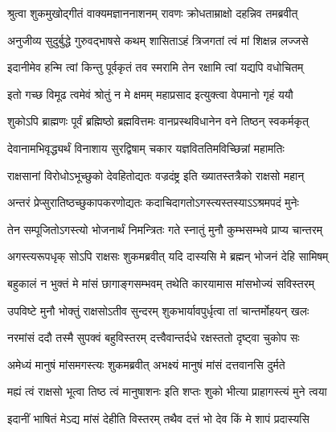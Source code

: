 




\twolineshloka
{श्रुत्वा शुकमुखोद्गीतं वाक्यमज्ञाननाशनम्}
{रावणः क्रोधताम्राक्षो दहन्निव तमब्रवीत्} %

\twolineshloka
{अनुजीव्य सुदुर्बुद्धे गुरुवद्भाषसे कथम्}
{शासिताऽहं त्रिजगतां त्वं मां शिक्षन्न लज्जसे} %

\twolineshloka
{इदानीमेव हन्मि त्वां किन्तु पूर्वकृतं तव}
{स्मरामि तेन रक्षामि त्वां यद्यपि वधोचितम्} %

\twolineshloka
{इतो गच्छ विमूढ त्वमेवं श्रोतुं न मे क्षमम्}
{महाप्रसाद इत्युक्त्वा वेपमानो गृहं ययौ} %

\twolineshloka
{शुकोऽपि ब्राह्मणः पूर्वं ब्रह्मिष्ठो ब्रह्मवित्तमः}
{वानप्रस्थविधानेन वने तिष्ठन् स्वकर्मकृत्} %

\twolineshloka
{देवानामभिवृद्ध्यर्थं विनाशाय सुरद्विषाम्}
{चकार यज्ञविततिमविच्छिन्नां महामतिः} %

\twolineshloka
{राक्षसानां विरोधोऽभूच्छुको देवहितोद्यतः}
{वज्रदंष्ट्र इति ख्यातस्तत्रैको राक्षसो महान्} %

\twolineshloka
{अन्तरं प्रेप्सुरातिष्ठच्छुकापकरणोद्यतः}
{कदाचिदागतोऽगस्त्यस्तस्याऽऽश्रमपदं मुनेः} %

\twolineshloka
{तेन सम्पूजितोऽगस्त्यो भोजनार्थं निमन्त्रितः}
{गते स्नातुं मुनौ कुम्भसम्भवे प्राप्य चान्तरम्} %

\twolineshloka
{अगस्त्यरूपधृक् सोऽपि राक्षसः शुकमब्रवीत्}
{यदि दास्यसि मे ब्रह्मन् भोजनं देहि सामिषम्} %

\twolineshloka
{बहुकालं न भुक्तं मे मांसं छागाङ्गसम्भवम्}
{तथेति कारयामास मांसभोज्यं सविस्तरम्} %

\twolineshloka
{उपविष्टे मुनौ भोक्तुं राक्षसोऽतीव सुन्दरम्}
{शुकभार्यावपुर्धृत्वा तां चान्तर्मोहयन् खलः} %

\twolineshloka
{नरमांसं ददौ तस्मै सुपक्वं बहुविस्तरम्}
{दत्त्वैवान्तर्दधे रक्षस्ततो दृष्ट्वा चुकोप सः} %

\twolineshloka
{अमेध्यं मानुषं मांसमगस्त्यः शुकमब्रवीत्}
{अभक्ष्यं मानुषं मांसं दत्तवानसि दुर्मते} %

\twolineshloka
{मह्यं त्वं राक्षसो भूत्वा तिष्ठ त्वं मानुषाशनः}
{इति शप्तः शुको भीत्या प्राहागस्त्यं मुने त्वया} %

\twolineshloka
{इदानीं भाषितं मेऽद्य मांसं देहीति विस्तरम्}
{तथैव दत्तं भो देव किं मे शापं प्रदास्यसि} %

